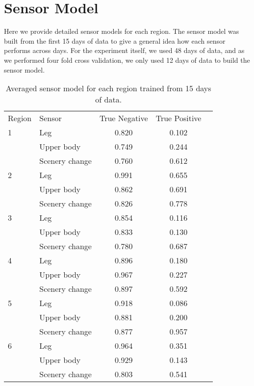 
\appendices
\label{sec:supplementary}
\section{Sensor Model}

Here we provide detailed sensor models for each region. The sensor model was built from the first 15 days of data to give a general idea how each sensor performs across days. For the experiment itself, we used 48 days of data, and as we performed four fold cross validation, we only used 12 days of data to build the sensor model.

\begin{table}[h]
	\centering
	\caption{Averaged sensor model for each region trained from 15 days of data.}
	\label{table:full_region_sensor_model}
	\begin{tabular}{llccc}
		\noalign{\hrule height 1.1pt}\noalign{\smallskip}
		Region & Sensor & True Negative & True Positive \\
		\noalign{\smallskip}\hline\noalign{\smallskip}
		1   & Leg               & 0.820 & 0.102 \\
		& Upper body        & 0.749 & 0.244 \\
		& Scenery change    & 0.760 & 0.612 \\ 
		2   & Leg               & 0.991 & 0.655 \\
		& Upper body        & 0.862 & 0.691 \\
		& Scenery change    & 0.826 & 0.778 \\
		3   & Leg               & 0.854 & 0.116 \\
		& Upper body        & 0.833 & 0.130 \\
		& Scenery change    & 0.780 & 0.687 \\
		4   & Leg               & 0.896 & 0.180 \\
		& Upper body        & 0.967 & 0.227 \\
		& Scenery change    & 0.897 & 0.592 \\
		5   & Leg               & 0.918 & 0.086 \\
		& Upper body        & 0.881 & 0.200 \\
		& Scenery change    & 0.877 & 0.957 \\
		6   & Leg               & 0.964 & 0.351 \\
		& Upper body        & 0.929 & 0.143 \\
		& Scenery change    & 0.803 & 0.541 \\

\end{tabular}
\end{table}
